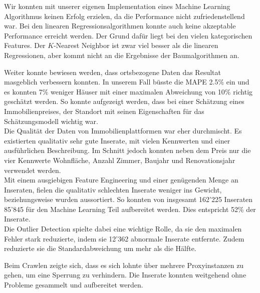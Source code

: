 Wir konnten mit unserer eigenen Implementation eines Machine Learning Algorithmus keinen Erfolg erzielen, da die Performance nicht zufriedenstellend war. Bei den linearen Regressionsalgorithmen konnte auch keine akzeptable Performance erreicht werden. Der Grund dafür liegt bei den vielen kategorischen Features. Der $K$-Nearest Neighbor ist zwar viel besser als die linearen Regressionen, aber kommt nicht an die Ergebnisse der Baumalgorithmen an.

Weiter konnte bewiesen werden, dass ortsbezogene Daten das Resultat masgeblich verbessern konnten. In unserem Fall büsste die MAPE 2.5\% ein und es konnten 7\% weniger Häuser mit einer maximalen Abweichung von 10\% richtig geschätzt werden. So konnte aufgezeigt werden, dass bei einer Schätzung eines Immobilienpreises, der Standort mit seinen Eigenschaften für das Schätzungsmodell wichtig war.\\[2ex]
%
Die Qualität der Daten von Immobilienplattformen war eher durchmischt. Es existierten qualitativ sehr gute Inserate, mit vielen Kennwerten und einer ausführlichen Beschreibung. Im Schnitt jedoch konnten neben dem Preis nur die vier Kennwerte Wohnfläche, Anzahl Zimmer, Baujahr und Renovationsjahr verwendet werden.\\
Mit einem ausgiebigen Feature Engineering und einer genügenden Menge an Inseraten, fielen die qualitativ schlechten Inserate weniger ins Gewicht, beziehungsweise wurden aussortiert.  So konnten von insgesamt 162’225 Inseraten 85’845 für den Machine Learning Teil aufbereitet werden. Dies entspricht 52\% der Inserate.\\
Die Outlier Detection spielte dabei eine wichtige Rolle, da sie den maximalen Fehler stark reduzierte, indem sie 12'362 abnormale Inserate entfernte. Zudem reduzierte sie die Standardabweichung um mehr als die Hälfte.

Beim Crawlen zeigte sich, dass es sich lohnte über mehrere Proxyinstanzen zu gehen, um eine Sperrung zu verhindern. Die Inserate konnten weitgehend ohne Probleme gesammelt und aufbereitet werden.
%
